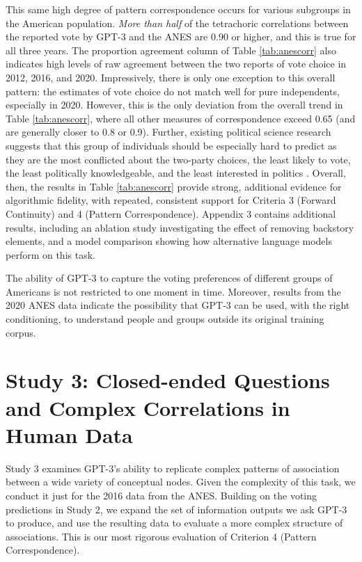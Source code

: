 \documentclass[11pt]{article}
\begin{document}
This same high degree of pattern correspondence occurs for various subgroups in the American population. \textit{More than half} of the tetrachoric correlations between the reported vote by GPT-3 and the ANES are 0.90 or higher, and this is true for all three years. The proportion agreement column of Table \ref{tab:anescorr} also indicates high levels of raw agreement between the two reports of vote choice in 2012, 2016, and 2020. Impressively, there is only one exception to this overall pattern: the estimates of vote choice do not match well for pure independents, especially in 2020. However, this is the only deviation from the overall trend in Table \ref{tab:anescorr}, where all other measures of correspondence exceed 0.65 (and are generally closer to 0.8 or 0.9). Further, existing political science research suggests that this group of individuals should be especially hard to predict as they are the most conflicted about the two-party choices, the least likely to vote, the least politically knowledgeable, and the least interested in politics \citep{Keith1992, magleby2011, klar2016}. Overall, then, the results in Table \ref{tab:anescorr} provide strong, additional evidence for algorithmic fidelity, with repeated, consistent support for Criteria 3 (Forward Continuity) and 4 (Pattern Correspondence).
%
Appendix 3 contains additional results, including an ablation study investigating the effect of removing backstory elements, and a model comparison showing how alternative language models perform on this task.

The ability of GPT-3 to capture the voting preferences of different groups of Americans is not restricted to one moment in time. Moreover, results from the 2020 ANES data indicate the possibility that GPT-3 can be used, with the right conditioning, to understand people and groups outside its original training corpus. %

\section{Study 3: Closed-ended Questions and Complex Correlations in Human Data}

Study 3 examines GPT-3's ability to replicate complex patterns of association between a wide variety of conceptual nodes. Given the complexity of this task, we conduct it just for the 2016 data from the ANES. Building on the voting predictions in Study 2, we expand the set of information outputs we ask GPT-3 to produce, and use the resulting data to evaluate a more complex structure of associations. This is our most rigorous evaluation of Criterion 4 (Pattern Correspondence).
\end{document}
